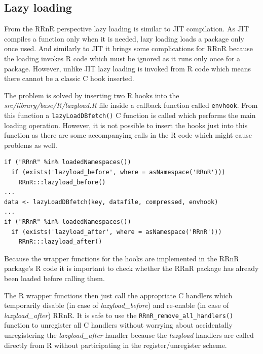 \documentclass[thesis=M,english,hidelinks]{FITthesis}[2012/10/20]
\begin{document}
		\subsection{Lazy loading}
		From the RRnR perspective lazy loading is similar to JIT compilation. As JIT compiles a function only when it is needed, lazy loading loads a package only once used. And similarly to JIT it brings some complications for RRnR because the loading invokes R code which must be ignored as it runs only once for a package. However, unlike JIT lazy loading is invoked from R code which means there cannot be a classic C hook inserted.\par
		
		The problem is solved by inserting two R hooks into the \emph{src/library/base/R/}\allowbreak\emph{lazyload.R} file inside a callback function called \lstinline|envhook|. From this function a \lstinline|lazyLoadDBfetch()| C function is called which performs the main loading operation. However, it is not possible to insert the hooks just into this function as there are some accompanying calls in the R code which might cause problems as well.\par
		
\begin{lstlisting}[style=filestyle, caption={The \emph{lazyload\_before} and \emph{lazyload\_after} hooks}]
if ("RRnR" %in% loadedNamespaces())
  if (exists('lazyload_before', where = asNamespace('RRnR')))
    RRnR:::lazyload_before()
...
data <- lazyLoadDBfetch(key, datafile, compressed, envhook)
...
if ("RRnR" %in% loadedNamespaces())
  if (exists('lazyload_after', where = asNamespace('RRnR')))
    RRnR:::lazyload_after()
\end{lstlisting}
		
		Because the wrapper functions for the hooks are implemented in the RRnR package's R code it is important to check whether the RRnR package has already been loaded before calling them.\par
		
		The R wrapper functions then just call the appropriate C handlers which temporarily disable (in case of \emph{lazyload\_before}) and re-enable (in case of \emph{lazyload\_after}) RRnR. It is safe to use the \lstinline|RRnR_remove_all_handlers()| function to unregister all C handlers without worrying about accidentally unregistering the \emph{lazyload\_after} handler because the \emph{lazyload} handlers are called directly from R without participating in the register/unregister scheme.\par
		
\end{document}
